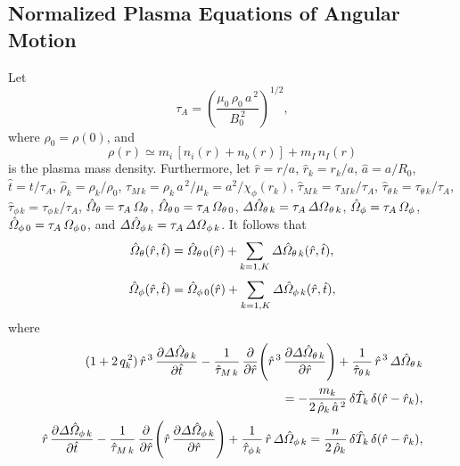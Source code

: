 \documentclass[12pt]{article}
\begin{document}
\subsection{Normalized Plasma Equations of Angular Motion}
Let 
\begin{equation}
\tau_A = \left(\frac{\mu_0\,\rho_0\,a^{\,2}}{B_0^{\,2}}\right)^{1/2},
\end{equation}
where
 $\rho_0=\rho(0)$,
 and
\begin{equation}
\rho(r)
\simeq  m_i\,[n_i(r)+n_b(r)] + m_I\,n_I(r)
\end{equation}
 is the plasma mass density.  
  Furthermore, let $\hat{r}=r/a$, $\hat{r}_k=r_k/a$, $\hat{a}=a/R_0$, $\hat{t}=t/\tau_A$, $\hat{\rho}_k=\rho_k/\rho_0$, $\tau_{M\,k} = \rho_k\,a^{\,2}/\mu_k= a^2/\chi_\phi(r_k)$, $\hat{\tau}_{M\,k}= \tau_{M\,k}/\tau_A$, 
$\hat{\tau}_{\theta\,k}=\tau_{\theta\,k}/\tau_A$, $
\hat{\tau}_{\phi\,k}=\tau_{\phi\,k}/\tau_A$, $\hat{\mit\Omega}_\theta=\tau_A\,{\mit\Omega}_\theta$, $\hat{\mit\Omega}_{\theta\,0}=\tau_A\,{\mit\Omega}_{\theta\,0}$,
${\mit\Delta}\hat{\mit\Omega}_{\theta\,k} = \tau_A\,{\mit\Delta\Omega}_{\theta\,k}$, $\hat{\mit\Omega}_\phi=\tau_A\,{\mit\Omega}_\phi$, $\hat{\mit\Omega}_{\phi\,0}=\tau_A\,{\mit\Omega}_{\phi\,0}$,
and 
${\mit\Delta}\hat{\mit\Omega}_{\phi\,k} = \tau_A\,{\mit\Delta\Omega}_{\phi\,k}$. It follows that
\begin{align}
\hat{\mit\Omega}_\theta(\hat{r},\hat{t}) &=\hat{\mit\Omega}_{\theta\,0}(\hat{r}) + \sum_{k=1,K}{\mit\Delta}\hat{\mit\Omega}_{\theta\,k}(\hat{r},\hat{t}),\\[0.5ex]
\hat{\mit\Omega}_\phi(\hat{r},\hat{t}) &=\hat{\mit\Omega}_{\phi\,0}(\hat{r}) + \sum_{k=1,K}{\mit\Delta}\hat{\mit\Omega}_{\phi\,k}(\hat{r},\hat{t}),
\end{align}
where
\begin{align}
(1+2\,q_k^{\,2})\,\hat{r}^{\,3}\,\frac{\partial{\mit\Delta}\hat{\mit\Omega}_{\theta\,k}}{\partial \hat{t}}-\frac{1}{\hat{\tau}_{M\,k}}\,\frac{\partial}{\partial \hat{r}}\!\left(
\hat{r}^{\,3}\,\frac{\partial{\mit\Delta}\hat{\mit\Omega}_{\theta\,k}}{\partial \hat{r}}\right) +\frac{1}{\hat{\tau}_{\theta\,k}}\,\hat{r}^{\,3}\,{\mit\Delta}\hat{\mit\Omega}_{\theta\,k}\nonumber\\[0.5ex]\phantom{==}=-\frac{m_k}{2\,\hat{\rho}_k\,\hat{a}^{\,2}}\,\delta\hat{T}_k\,\delta (\hat{r}-\hat{r}_k),\label{exxx}\\[0.5ex]
\hat{r}\,\frac{\partial{\mit\Delta}\hat{\mit\Omega}_{\phi\,k}}{\partial \hat{t}}-\frac{1}{\hat{\tau}_{M\,k}}\,\frac{\partial}{\partial \hat{r}}\!\left(
\hat{r}\,\frac{\partial{\mit\Delta}\hat{\mit\Omega}_{\phi\,k}}{\partial \hat{r}}\right) +\frac{1}{\hat{\tau}_{\phi\,k}}\,\hat{r}\,{\mit\Delta}\hat{\mit\Omega}_{\phi\,k}
= \frac{n}{2\,\hat{\rho}_k}\,\delta \hat{T}_{k}\,\delta(\hat{r}-\hat{r}_k),\label{eyyy}
\end{align}
\end{document}
